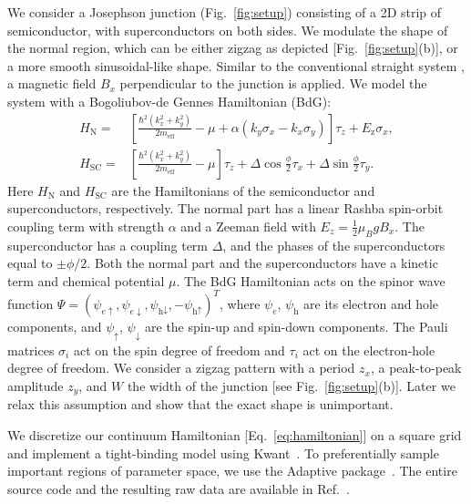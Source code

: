 \documentclass[english, twocolumn, 10pt, aps, superscriptaddress, floatfix, prb, citeautoscript]{revtex4-1}
\newcommand{\kx}{k_x}
\newcommand{\ky}{k_y}
\newcommand{\meff}{m_\text{eff}}
\renewcommand{\comment}[2]{#2}
\begin{document}
\comment{We consider a two-dimensional system with zigzag and BdG Hamiltonian.}
We consider a Josephson junction (Fig.~\ref{fig:setup}) consisting of a 2D strip of semiconductor, with superconductors on both sides.
We modulate the shape of the normal region, which can be either zigzag as depicted [Fig.~\ref{fig:setup}(b)], or a more smooth sinusoidal-like shape.
Similar to the conventional straight system \cite{pientka2017topological}, a magnetic field $B_x$ perpendicular to the junction is applied.
We model the system with a Bogoliubov-de Gennes Hamiltonian (BdG):
\begin{subequations}
\begin{align}
    H_\textrm{N} = & \left[\frac{\hbar^2\left(\kx^2 + \ky^2\right)}{2\meff} - \mu + \alpha \left( \ky \sigma_x - \kx \sigma_y \right) \right] \tau_z
        + E_\text{z} \sigma_x, \\
    H_\textrm{SC} = & \left[\frac{\hbar^2\left(\kx^2 + \ky^2\right)}{2\meff} - \mu\right] \tau_z
        + \Delta \cos{\frac{\phi}{2}} \tau_x + \Delta \sin{\frac{\phi}{2}} \tau_y.
\end{align}
\label{eq:hamiltonian}
\end{subequations}
Here $H_\textrm{N}$ and $H_\textrm{SC}$ are the Hamiltonians of the semiconductor and superconductors, respectively.
The normal part has a linear Rashba spin-orbit coupling term with strength $\alpha$ and a Zeeman field with $E_z=\frac{1}{2} \mu_B g B_x$.
The superconductor has a coupling term $\Delta$, and the phases of the superconductors equal to $\pm\phi/2$.
Both the normal part and the superconductors have a kinetic term and chemical potential $\mu$.
The BdG Hamiltonian acts on the spinor wave function $\Psi={\left(\psi_{e\uparrow},\psi_{e\downarrow},\psi_{\textrm{h}\downarrow},-\psi_{\textrm{h}\uparrow}\right)}^{T}$, where $\psi_e$, $\psi_\textrm{h}$ are its electron and hole components, and $\psi_\uparrow$, $\psi_\downarrow$ are the spin-up and spin-down components.
The Pauli matrices $\sigma_{i}$ act on the spin degree of freedom and $\tau_{i}$ act on the electron-hole degree of freedom.
We consider a zigzag pattern with a period $z_x$, a peak-to-peak amplitude $z_y$, and $W$ the width of the junction [see Fig.~\ref{fig:setup}(b)].
Later we relax this assumption and show that the exact shape is unimportant.

\comment{We discretize the Hamiltonian and simulate it with Kwant.}
We discretize our continuum Hamiltonian [Eq.~\eqref{eq:hamiltonian}] on a square grid and implement a tight-binding model using Kwant~\cite{groth_kwant:_2014}.
To preferentially sample important regions of parameter space, we use the Adaptive package~\cite{adaptive}.
The entire source code and the resulting raw data are available in Ref.~.  %
\end{document}
